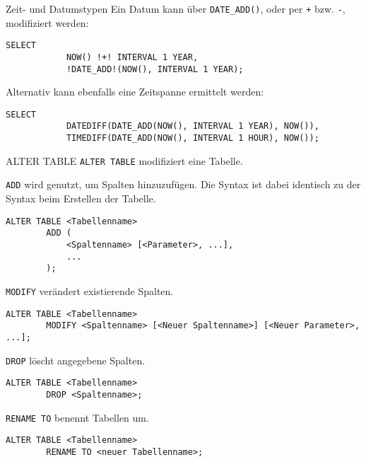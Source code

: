 \begin{sql}{Zeit- und Datumstypen}
    Ein Datum kann über \texttt{DATE\_ADD()}, oder per \texttt{+} bzw. \texttt{-}, modifiziert werden:

    \begin{lstlisting}[language=mysql]
        SELECT
            NOW() !+! INTERVAL 1 YEAR,
            !DATE_ADD!(NOW(), INTERVAL 1 YEAR);
    \end{lstlisting}

    Alternativ kann ebenfalls eine Zeitspanne ermittelt werden:

    \begin{lstlisting}[language=mysql]
        SELECT
            DATEDIFF(DATE_ADD(NOW(), INTERVAL 1 YEAR), NOW()),
            TIMEDIFF(DATE_ADD(NOW(), INTERVAL 1 HOUR), NOW());
    \end{lstlisting}
\end{sql}

\begin{sql}{ALTER TABLE}
    \texttt{ALTER TABLE} modifiziert eine Tabelle.

    \texttt{ADD} wird genutzt, um Spalten hinzuzufügen.
    Die Syntax ist dabei identisch zu der Syntax beim Erstellen der Tabelle.

    \begin{lstlisting}[language=mysql]
        ALTER TABLE <Tabellenname>
        ADD (
            <Spaltenname> [<Parameter>, ...],
            ...
        );
    \end{lstlisting}

    \texttt{MODIFY} verändert existierende Spalten.

    \begin{lstlisting}[language=mysql]
        ALTER TABLE <Tabellenname>
        MODIFY <Spaltenname> [<Neuer Spaltenname>] [<Neuer Parameter>, ...];
    \end{lstlisting}

    \texttt{DROP} löscht angegebene Spalten.

    \begin{lstlisting}[language=mysql]
        ALTER TABLE <Tabellenname>
        DROP <Spaltenname>;
    \end{lstlisting}

    \texttt{RENAME TO} benennt Tabellen um.

    \begin{lstlisting}[language=mysql]
        ALTER TABLE <Tabellenname>
        RENAME TO <neuer Tabellenname>;
    \end{lstlisting}
\end{sql}

